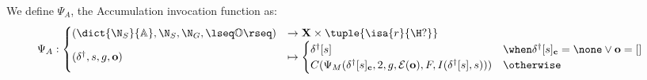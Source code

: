 We define $\Psi_A$, the Accumulation invocation function as:
\begin{align}
  \Psi_A &:
  \begin{cases}
    \left(
        \dict{\N_S}{\mathbb{A}},\N_S,\N_G,\lseq\mathbb{O}\rseq
    \right)
    &\to
    \mathbf{X} \times \tuple{\isa{r}{\H?}}\\
    (\delta^\dagger, s, g, \mathbf{o}) &\mapsto \begin{cases}
      \delta^\dagger[s] &\when \delta^\dagger[s]_\mathbf{c} = \none \vee \mathbf{o} = [] \\
      C(\Psi_M(\delta^\dagger[s]_\mathbf{c}, 2, g, \mathcal{E}(\mathbf{o}), F, I(\delta^\dagger[s], s))) &\otherwise
    \end{cases} \\
  \end{cases}
\end{align}
